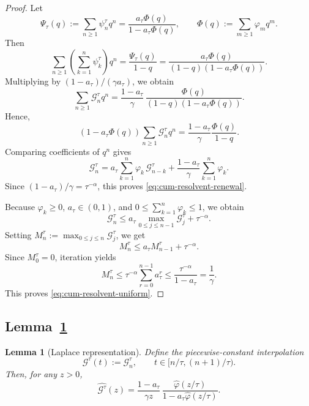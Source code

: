 \documentclass[letterpaper]{article}
\numberwithin{equation}{section}
\newtheorem{lemma}[theorem]{Lemma}
\theoremstyle{definition}
\theoremstyle{remark}
\begin{document}
\begin{proof}
Let
\[
  \Psi_\tau(q):=\sum_{n\ge1}\psi_n^\tau q^n
  =\frac{a_\tau\Phi(q)}{1-a_\tau\Phi(q)},
  \qquad
  \Phi(q):=\sum_{m\ge1}\varphi_m q^m.
\]
Then
\[
  \sum_{n\ge1}\left(\sum_{k=1}^n\psi_k^\tau\right)q^n
  =\frac{\Psi_\tau(q)}{1-q}
  =\frac{a_\tau\Phi(q)}{(1-q)(1-a_\tau\Phi(q))}.
\]
Multiplying by $(1-a_\tau)/(\gamma a_\tau)$, we obtain
\[
  \sum_{n\ge1}\mathcal G_n^\tau q^n
  =
  \frac{1-a_\tau}{\gamma}\,
  \frac{\Phi(q)}{(1-q)(1-a_\tau\Phi(q))}.
\]
Hence,
\[
  (1-a_\tau\Phi(q))\sum_{n\ge1}\mathcal G_n^\tau q^n
  =
  \frac{1-a_\tau}{\gamma}\frac{\Phi(q)}{1-q}.
\]
Comparing coefficients of $q^n$ gives
\[
  \mathcal G_n^\tau
  =
  a_\tau\sum_{k=1}^n\varphi_k\,\mathcal G_{n-k}^\tau
  +\frac{1-a_\tau}{\gamma}\sum_{k=1}^n\varphi_k.
\]
Since $(1-a_\tau)/\gamma=\tau^{-\alpha}$, this proves
\eqref{eq:cum-resolvent-renewal}.

Because $\varphi_k\ge0$, $a_\tau\in(0,1)$, and
$0\le \sum_{k=1}^n\varphi_k\le 1$,
we obtain
\[
  \mathcal G_n^\tau
  \le a_\tau \max_{0\le j\le n-1}\mathcal G_j^\tau+\tau^{-\alpha}.
\]
Setting $M_n^\tau:=\max_{0\le j\le n}\mathcal G_j^\tau$, we get
\[
  M_n^\tau\le a_\tau M_{n-1}^\tau+\tau^{-\alpha}.
\]
Since $M_0^\tau=0$, iteration yields
\[
  M_n^\tau
  \le \tau^{-\alpha}\sum_{r=0}^{n-1}a_\tau^r
  \le \frac{\tau^{-\alpha}}{1-a_\tau}
  =\frac1\gamma.
\]
This proves \eqref{eq:cum-resolvent-uniform}.
\end{proof}


\subsection{Lemma~\ref{lem:cum-resolvent-laplace}}\label{app:proof-cum-resolvent-laplace}

\begin{lemma}[Laplace representation]
\label{lem:cum-resolvent-laplace}
Define the piecewise-constant interpolation
\[
  \mathcal G^\tau(t):=\mathcal G_n^\tau,
  \qquad t\in[n/\tau,(n+1)/\tau).
\]
Then, for any $z>0$,
\begin{equation}\label{eq:cum-resolvent-laplace-simplified}
  \widehat{\mathcal G^\tau}(z)
  =
  \frac{1-a_\tau}{\gamma z}\,
  \frac{\hat\varphi(z/\tau)}{1-a_\tau\hat\varphi(z/\tau)}.
\end{equation}
\end{lemma}
\end{document}
